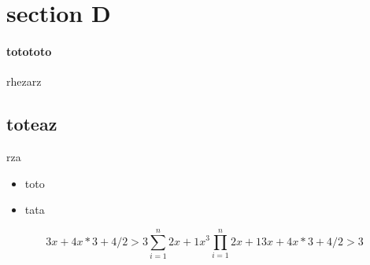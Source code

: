\documentclass{article}
\begin{document}
\section{section D}{\paragraph{totototo}{rhezarz}\subsection{toteaz}{rza}}
\begin{itemize}
	 \item toto
	        \item tata
   
	        
	        
	        
	        
	        
\end{itemize}

\begin{equation}
3x+4x*3+4/2 > 3
{\sum_{i=1 }^{n} 2x+1} 
x^{3}
{\prod_{i=1 }^{n} 2x+1}
3x+4x*3+4/2 > 3
\end{equation}
\end{document}
